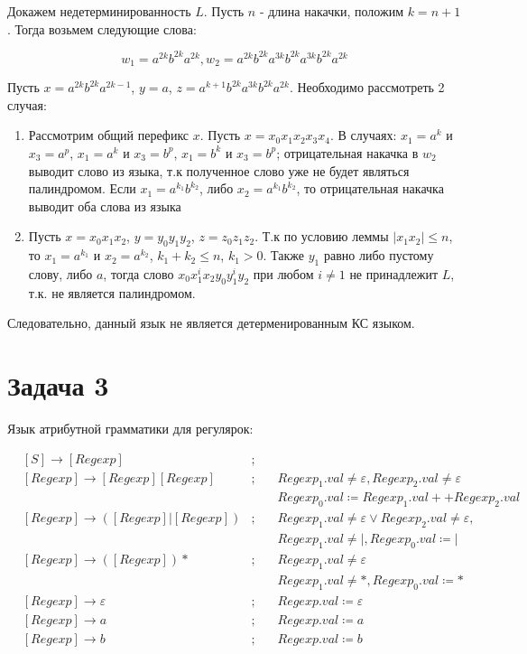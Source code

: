 \documentclass[a4paper, 14pt]{article}
\begin{document}
Докажем недетерминированность $L$. Пусть $n$ - длина накачки, положим $k = n + 1$. Тогда возьмем следующие слова: 

$$w_1 = a^{2k}b^{2k}a^{2k}, w_2 = a^{2k}b^{2k}a^{3k}b^{2k}a^{3k}b^{2k}a^{2k}$$

Пусть $x = a^{2k}b^{2k}a^{2k - 1}$, $y = a$, $z = a^{k + 1}b^{2k}a^{3k}b^{2k}a^{2k}$. Необходимо рассмотреть 2 случая:

\begin{enumerate}
  \item{Рассмотрим общий перефикс $x$. Пусть $x = x_0 x_1 x_2 x_3 x_4$. В случаях: $x_1 = a^k$ и $x_3 = a^p$, $x_1 = a^k$ и $x_3 = b^p$, $x_1 = b^k$ и $x_3 = b^p$}; отрицательная накачка в $w_2$ выводит слово из языка, т.к полученное слово уже не будет являться палиндромом. Если $x_1 = a^{k_1} b^{k_2}$, либо $x_2 = a^{k_1} b^{k_2}$, то отрицательная накачка выводит оба слова из языка
  \item{Пусть $x = x_0 x_1 x_2$, $y = y_0 y_1 y_2$, $z = z_0 z_1 z_2$}. Т.к по условию леммы $|x_1 x_2| \leq n$, то $x_1 = a^{k_1}$ и $x_2 = a^{k_2}$, $k_1 + k_2 \leq n$, $k_1 > 0$. Также $y_1$ равно либо пустому слову, либо $a$, тогда слово $x_0 x_1^{i} x_2 y_0 y_1^{i} y_2$ при любом $i \neq 1$ не принадлежит $L$, т.к. не является палиндромом.
\end{enumerate}

Следовательно, данный язык не является детерменированным КС языком.

\newpage 

\section{Задача 3}

Язык атрибутной грамматики для регулярок:

$$
\begin{aligned}
  &[S] \rightarrow [Regexp] &;  \quad  \\
  &[Regexp] \rightarrow [Regexp][Regexp] &; \quad  &{Regexp_{1}.val \neq \varepsilon, Regexp_{2}.val \neq \varepsilon} \\
  & & \quad &{Regexp_{0}.val \coloneqq Regexp_{1}.val ++ Regexp_{2}.val}\\
  &[Regexp] \rightarrow ([Regexp]|[Regexp]) &; \quad &{Regexp_{1}.val \neq \varepsilon \lor Regexp_{2}.val \neq \varepsilon}, \\
  & & \quad &{Regexp_{1}.val \neq |}, Regexp_{0}.val \coloneqq | \\
  &[Regexp] \rightarrow ([Regexp])* &; \quad &{Regexp_{1}.val \neq \varepsilon}\\
  & & \quad &{Regexp_{1}.val \neq *}, Regexp_{0}.val \coloneqq * \\
  &[Regexp] \rightarrow \varepsilon &; \quad &{Regexp.val \coloneqq \varepsilon} \\
  &[Regexp] \rightarrow a &;  \quad &{Regexp.val \coloneqq a} \\
  &[Regexp] \rightarrow b &; \quad  &{Regexp.val \coloneqq b}
\end{aligned}
$$
\end{document}
